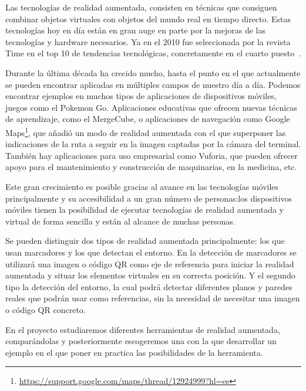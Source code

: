
Las tecnologías de realidad aumentada, consisten en técnicas que consiguen combinar objetos virtuales con objetos del mundo real en tiempo directo. 
Estas tecnologías hoy en día están en gran auge en parte por la mejoras de las tecnologías y hardware necesarios. Ya en el 2010 fue seleccionada por la revista Time en el top 10 de tendencias tecnológicas, concretamente en el cuarto puesto~\cite{fletcher_2010}. 

Durante la última década ha crecido mucho, hasta el punto en el que actualmente se pueden encontrar aplicadas en múltiples campos de nuestro día a día. Podemos encontrar ejemplos en muchos tipos de aplicaciones de dispositivos móviles, juegos como el Pokemon Go. Aplicaciones educativas que ofrecen nuevas técnicas de aprendizaje, como el MergeCube, o aplicaciones de navegación como Google Maps\footnote{\url{https://support.google.com/maps/thread/12924999?hl=es}}, que añadió un modo de realidad aumentada con el que superponer las indicaciones de la ruta a seguir en la imagen captadas por la cámara del terminal. También hay aplicaciones para uso empresarial como Vuforia, que pueden ofrecer apoyo para el mantenimiento y construcción de maquinarias, en la medicina, etc.


Este gran crecimiento es posible gracias al avance en las tecnologías móviles principalmente y su accesibilidad a un gran número de personas:los dispositivos móviles tienen la posibilidad de ejecutar tecnologías de realidad aumentada y virtual de forma sencilla y están al alcance de muchas personas.

Se pueden distinguir dos tipos de realidad aumentada principalmente: los que usan marcadores y los que detectan el entorno. En la detección de marcadores se utilizará una imagen o código QR como eje de referencia para iniciar la realidad aumentada y situar los elementos virtuales en su correcta posición. 
Y el segundo tipo la detección del entorno, la cual podrá detectar diferentes planos y paredes reales que podrán usar como referencias, sin la necesidad de necesitar una imagen o código QR concreto.


En el proyecto estudiaremos diferentes herramientas de realidad aumentada, comparándolas y posteriormente escogeremos una con la que desarrollar un ejemplo en el que poner en practica las posibilidades de la herramienta. 


